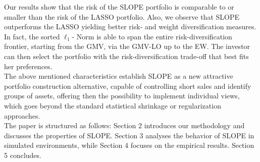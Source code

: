\documentclass[12pt, a4paper]{article}
\begin{document}
Our results show that the risk of the SLOPE portfolio is comparable to or smaller than the risk of the LASSO portfolio. Also, we observe that SLOPE outperforms the LASSO yielding better risk- and weight diversification measures. In fact, the sorted $\ell_{1}$- Norm is able to span the entire risk-diversification frontier, starting from the GMV, via the GMV-LO up to the EW. The investor can then select the portfolio with the risk-diversification trade-off that best fits her preferences.\\
The above mentioned characteristics establish SLOPE as a new attractive portfolio construction alternative, capable of controlling short sales and identify groups of assets, offering then the possibility to implement individual views, which goes beyond the standard statistical shrinkage or regularization approaches.\\
The paper is structured as follows: Section 2 introduces our methodology and discusses the properties of SLOPE. %
Section 3 analyses the behavior of SLOPE in simulated environments, while Section 4 focuses on the empirical results. Section 5 concludes.


\end{document}
